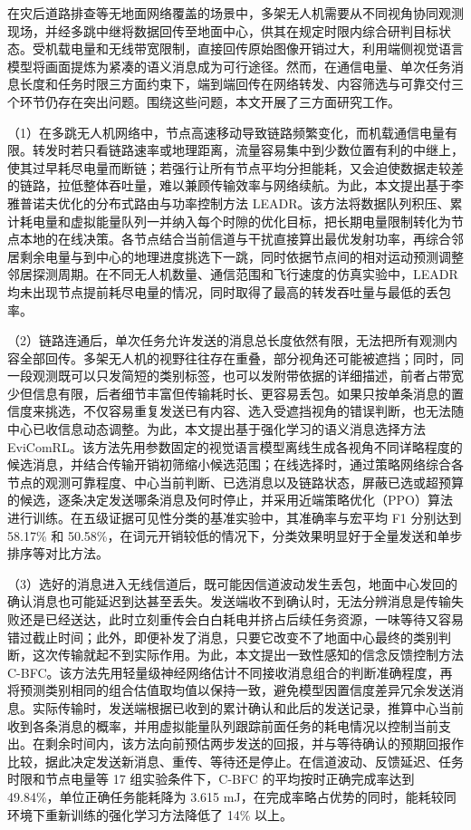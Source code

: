 \begin{cabstract}

在灾后道路排查等无地面网络覆盖的场景中，多架无人机需要从不同视角协同观测现场，并经多跳中继将数据回传至地面中心，供其在规定时限内综合研判目标状态。受机载电量和无线带宽限制，直接回传原始图像开销过大，利用端侧视觉语言模型将画面提炼为紧凑的语义消息成为可行途径。然而，在通信电量、单次任务消息长度和任务时限三方面约束下，端到端回传在网络转发、内容筛选与可靠交付三个环节仍存在突出问题。围绕这些问题，本文开展了三方面研究工作。

（1）在多跳无人机网络中，节点高速移动导致链路频繁变化，而机载通信电量有限。转发时若只看链路速率或地理距离，流量容易集中到少数位置有利的中继上，使其过早耗尽电量而断链；若强行让所有节点平均分担能耗，又会迫使数据走较差的链路，拉低整体吞吐量，难以兼顾传输效率与网络续航。为此，本文提出基于李雅普诺夫优化的分布式路由与功率控制方法 LEADR。该方法将数据队列积压、累计耗电量和虚拟能量队列一并纳入每个时隙的优化目标，把长期电量限制转化为节点本地的在线决策。各节点结合当前信道与干扰直接算出最优发射功率，再综合邻居剩余电量与到中心的地理进度挑选下一跳，同时依据节点间的相对运动预测调整邻居探测周期。在不同无人机数量、通信范围和飞行速度的仿真实验中，LEADR 均未出现节点提前耗尽电量的情况，同时取得了最高的转发吞吐量与最低的丢包率。

（2）链路连通后，单次任务允许发送的消息总长度依然有限，无法把所有观测内容全部回传。多架无人机的视野往往存在重叠，部分视角还可能被遮挡；同时，同一段观测既可以只发简短的类别标签，也可以发附带依据的详细描述，前者占带宽少但信息有限，后者细节丰富但传输耗时长、更容易丢包。如果只按单条消息的置信度来挑选，不仅容易重复发送已有内容、选入受遮挡视角的错误判断，也无法随中心已收信息动态调整。为此，本文提出基于强化学习的语义消息选择方法 EviComRL。该方法先用参数固定的视觉语言模型离线生成各视角不同详略程度的候选消息，并结合传输开销初筛缩小候选范围；在线选择时，通过策略网络综合各节点的观测可靠程度、中心当前判断、已选消息以及链路状态，屏蔽已选或超预算的候选，逐条决定发送哪条消息及何时停止，并采用近端策略优化（PPO）算法进行训练。在五级证据可见性分类的基准实验中，其准确率与宏平均 F1 分别达到 58.17\% 和 50.58\%，在词元开销较低的情况下，分类效果明显好于全量发送和单步排序等对比方法。

（3）选好的消息进入无线信道后，既可能因信道波动发生丢包，地面中心发回的确认消息也可能延迟到达甚至丢失。发送端收不到确认时，无法分辨消息是传输失败还是已经送达，此时立刻重传会白白耗电并挤占后续任务资源，一味等待又容易错过截止时间；此外，即便补发了消息，只要它改变不了地面中心最终的类别判断，这次传输就起不到实际作用。为此，本文提出一致性感知的信念反馈控制方法 C-BFC。该方法先用轻量级神经网络估计不同接收消息组合的判断准确程度，再将预测类别相同的组合估值取均值以保持一致，避免模型因置信度差异冗余发送消息。实际传输时，发送端根据已收到的累计确认和此后的发送记录，推算中心当前收到各条消息的概率，并用虚拟能量队列跟踪前面任务的耗电情况以控制当前支出。在剩余时间内，该方法向前预估两步发送的回报，并与等待确认的预期回报作比较，据此决定发送新消息、重传、等待还是停止。在信道波动、反馈延迟、任务时限和节点电量等 17 组实验条件下，C-BFC 的平均按时正确完成率达到 49.84\%，单位正确任务能耗降为 3.615 mJ，在完成率略占优势的同时，能耗较同环境下重新训练的强化学习方法降低了 14\% 以上。
\end{cabstract}

